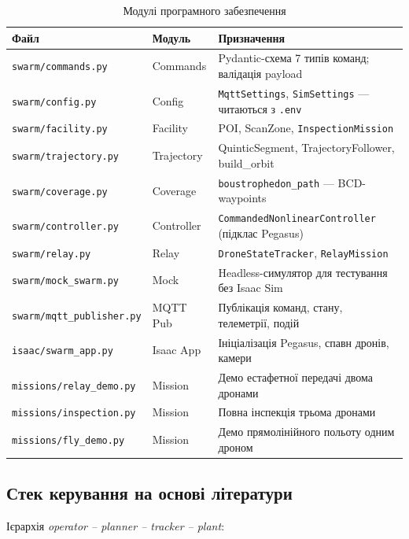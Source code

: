 \begin{table}[h]
  \centering
  \caption{Модулі програмного забезпечення}
  \begin{tabularx}{\linewidth}{llX}
    \toprule
    Файл & Модуль & Призначення \\
    \midrule
    \texttt{swarm/commands.py}       & Commands   & Pydantic-схема 7 типів команд; валідація payload \\
    \texttt{swarm/config.py}         & Config     & \texttt{MqttSettings}, \texttt{SimSettings} — читаються з \texttt{.env} \\
    \texttt{swarm/facility.py}       & Facility   & POI, ScanZone, \texttt{InspectionMission} \\
    \texttt{swarm/trajectory.py}     & Trajectory & QuinticSegment, TrajectoryFollower, build\_orbit \\
    \texttt{swarm/coverage.py}       & Coverage   & \texttt{boustrophedon\_path} — BCD-waypoints \\
    \texttt{swarm/controller.py}     & Controller & \texttt{CommandedNonlinearController} (підклас Pegasus) \\
    \texttt{swarm/relay.py}          & Relay      & \texttt{DroneStateTracker}, \texttt{RelayMission} \\
    \texttt{swarm/mock\_swarm.py}    & Mock       & Headless-симулятор для тестування без Isaac Sim \\
    \texttt{swarm/mqtt\_publisher.py}& MQTT Pub   & Публікація команд, стану, телеметрії, подій \\
    \texttt{isaac/swarm\_app.py}     & Isaac App  & Ініціалізація Pegasus, спавн дронів, камери \\
    \texttt{missions/relay\_demo.py} & Mission    & Демо естафетної передачі двома дронами \\
    \texttt{missions/inspection.py}  & Mission    & Повна інспекція трьома дронами \\
    \texttt{missions/fly\_demo.py}   & Mission    & Демо прямолінійного польоту одним дроном \\
    \bottomrule
  \end{tabularx}
  \label{tab:modules}
\end{table}

\subsection{Стек керування на основі літератури}

Ієрархія \emph{operator – planner – tracker – plant}:


